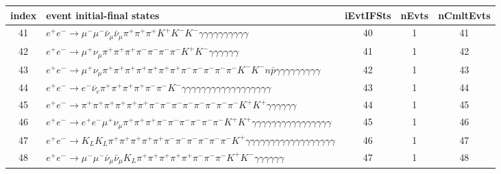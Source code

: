 \documentclass[landscape]{article}
\begin{document}
\clearpage

\begin{table}[htbp!]
\small
\centering
\begin{tabular}{|c|>{\centering}p{18cm}|c|c|c|}
\hline
index & event initial-final states & iEvtIFSts & nEvts & nCmltEvts \\
\hline
41 & $ e^{+} e^{-} \rightarrow \mu^{-} \mu^{-} \bar{\nu}_{\mu} \bar{\nu}_{\mu} \pi^{+} \pi^{+} \pi^{+} K^{+} K^{-} K^{-} \gamma \gamma \gamma \gamma \gamma \gamma \gamma \gamma \gamma \gamma $ & 40 & 1 & 41 \\
\hline
42 & $ e^{+} e^{-} \rightarrow \mu^{+} \nu_{\mu} \pi^{+} \pi^{+} \pi^{+} \pi^{-} \pi^{-} \pi^{-} \pi^{-} K^{+} K^{-} \gamma \gamma \gamma \gamma \gamma \gamma $ & 41 & 1 & 42 \\
\hline
43 & $ e^{+} e^{-} \rightarrow \mu^{+} \nu_{\mu} \pi^{+} \pi^{+} \pi^{+} \pi^{+} \pi^{+} \pi^{+} \pi^{+} \pi^{-} \pi^{-} \pi^{-} \pi^{-} \pi^{-} K^{-} K^{-} n \bar{p} \gamma \gamma \gamma \gamma \gamma \gamma \gamma \gamma \gamma $ & 42 & 1 & 43 \\
\hline
44 & $ e^{+} e^{-} \rightarrow e^{-} \bar{\nu}_{e} \pi^{+} \pi^{+} \pi^{+} \pi^{+} \pi^{-} \pi^{-} K^{-} \gamma \gamma \gamma \gamma \gamma \gamma \gamma \gamma \gamma \gamma \gamma \gamma \gamma \gamma \gamma \gamma \gamma \gamma $ & 43 & 1 & 44 \\
\hline
45 & $ e^{+} e^{-} \rightarrow \pi^{+} \pi^{+} \pi^{+} \pi^{+} \pi^{+} \pi^{+} \pi^{-} \pi^{-} \pi^{-} \pi^{-} \pi^{-} \pi^{-} \pi^{-} \pi^{-} K^{+} K^{+} \gamma \gamma \gamma \gamma \gamma \gamma $ & 44 & 1 & 45 \\
\hline
46 & $ e^{+} e^{-} \rightarrow e^{+} e^{-} \mu^{+} \nu_{\mu} \pi^{+} \pi^{+} \pi^{+} \pi^{-} \pi^{-} \pi^{-} \pi^{-} \pi^{-} \pi^{-} K^{+} K^{+} \gamma \gamma \gamma \gamma \gamma \gamma \gamma \gamma \gamma \gamma \gamma \gamma \gamma \gamma \gamma \gamma $ & 45 & 1 & 46 \\
\hline
47 & $ e^{+} e^{-} \rightarrow K_{L} K_{L} \pi^{+} \pi^{+} \pi^{+} \pi^{+} \pi^{+} \pi^{-} \pi^{-} \pi^{-} \pi^{-} \pi^{-} \pi^{-} K^{+} \gamma \gamma \gamma \gamma \gamma \gamma \gamma \gamma \gamma \gamma \gamma \gamma \gamma \gamma \gamma \gamma \gamma \gamma $ & 46 & 1 & 47 \\
\hline
48 & $ e^{+} e^{-} \rightarrow \mu^{-} \mu^{-} \bar{\nu}_{\mu} \bar{\nu}_{\mu} K_{L} \pi^{+} \pi^{+} \pi^{+} \pi^{+} \pi^{+} \pi^{-} \pi^{-} \pi^{-} K^{+} K^{-} \gamma \gamma \gamma \gamma \gamma \gamma $ & 47 & 1 & 48 \\
\hline

\end{tabular}
\end{table}
\end{document}
